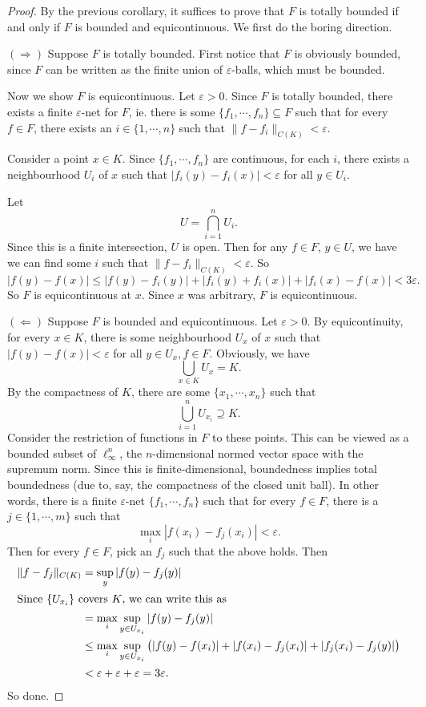 \documentclass[a4paper]{article}
\begin{document}
\begin{proof}
  By the previous corollary, it suffices to prove that $F$ is totally bounded if and only if $F$ is bounded and equicontinuous. We first do the boring direction.

  $(\Rightarrow)$ Suppose $F$ is totally bounded. First notice that $F$ is obviously bounded, since $F$ can be written as the finite union of $\varepsilon$-balls, which must be bounded.

  Now we show $F$ is equicontinuous. Let $\varepsilon > 0$. Since $F$ is totally bounded, there exists a finite $\varepsilon$-net for $F$, ie. there is some $\{f_1, \cdots, f_n\} \subseteq F$ such that for every $f \in F$, there exists an $i\in \{1, \cdots, n\}$ such that $\|f - f_i\|_{C(K)} < \varepsilon$.

  Consider a point $x \in K$. Since $\{f_1, \cdots, f_n\}$ are continuous, for each $i$, there exists a neighbourhood $U_i$ of $x$ such that $|f_i (y) - f_i(x)| < \varepsilon$ for all $y \in U_i$.

  Let
  \[
    U = \bigcap_{i = 1}^n U_i.
  \]
  Since this is a finite intersection, $U$ is open. Then for any $f \in F$, $y \in U$, we have we can find some $i$ such that $\|f - f_i\|_{C(K)} < \varepsilon$. So
  \[
    |f(y) - f(x)| \leq |f(y) - f_i(y)| + |f_i(y) + f_i(x)| + |f_i(x) - f(x)| < 3\varepsilon.
  \]
  So $F$ is equicontinuous at $x$. Since $x$ was arbitrary, $F$ is equicontinuous.

  $(\Leftarrow)$ Suppose $F$ is bounded and equicontinuous. Let $\varepsilon > 0$. By equicontinuity, for every $x \in K$, there is some neighbourhood $U_x$ of $x$ such that $|f(y) - f(x)| < \varepsilon$ for all $y \in U_x, f \in F$. Obviously, we have
  \[
    \bigcup_{x \in K}U_x = K.
  \]
  By the compactness of $K$, there are some $\{x_1, \cdots, x_n\}$ such that
  \[
    \bigcup_{i = 1}^n U_{x_i}\supseteq K.
  \]
  Consider the restriction of functions in $F$ to these points. This can be viewed as a bounded subset of $\ell^n_{\infty}$, the $n$-dimensional normed vector space with the supremum norm. Since this is finite-dimensional, boundedness implies total boundedness (due to, say, the compactness of the closed unit ball). In other words, there is a finite $\varepsilon$-net $\{f_1, \cdots, f_n\}$ such that for every $f \in F$, there is a $j \in \{1, \cdots, m\}$ such that
  \[
    \max_i |f(x_i) - f_j(x_i)| < \varepsilon.
  \]
  Then for every $f \in F$, pick an $f_j$ such that the above holds. Then
  \begin{align*}
    \|f - f_j\|_{C(K)} &= \sup_y |f(y) - f_j(y)|\\
    \intertext{Since $\{U_{x_i}\}$ covers $K$, we can write this as}
    &= \max_i \sup_{y \in U_{x_i}}|f(y) - f_j(y)|\\
    &\leq \max_i \sup_{y \in U_{x_i}} \big(|f(y) - f(x_i)| + |f(x_i) - f_j(x_i)| + |f_j(x_i) - f_j(y)|\big)\\
    &< \varepsilon + \varepsilon +\varepsilon = 3\varepsilon.
  \end{align*}
  So done.
\end{proof}
\end{document}
